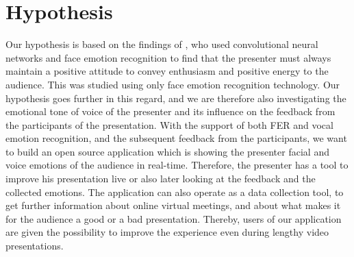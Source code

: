 \section{Hypothesis}
\label{sec:hypothesis}
Our hypothesis is based on the findings of , who used convolutional neural networks and face emotion recognition to find that the presenter must always maintain a positive attitude to convey enthusiasm and positive energy to the audience. This was studied using only face emotion recognition technology. Our hypothesis goes further in this regard, and we are therefore also investigating the emotional tone of voice of the presenter and its influence on the feedback from the participants of the presentation. With the support of both FER and vocal emotion recognition, and the subsequent feedback from the participants, we want to build an open source application which is showing the presenter facial and voice emotions of the audience in real-time. Therefore, the presenter has a tool to improve his presentation live or also later looking at the feedback and the collected emotions. The application can also operate as a data collection tool, to get further information about online virtual meetings, and about what makes it for the audience a good or a bad presentation. Thereby, users of our application are given the possibility to improve the experience even during lengthy video presentations.
